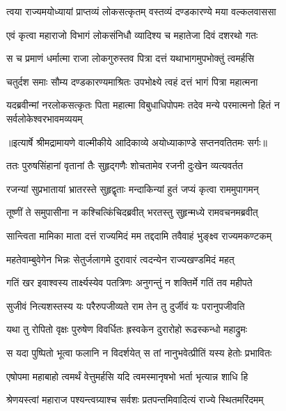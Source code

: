 \twolineshloka
{त्वया राज्यमयोध्यायां प्राप्तव्यं लोकसत्कृतम्}
{वस्तव्यं दण्डकारण्ये मया वल्कलवाससा} %

\twolineshloka
{एवं कृत्वा महाराजो विभागं लोकसंनिधौ}
{व्यादिश्य च महातेजा दिवं दशरथो गतः} %

\twolineshloka
{स च प्रमाणं धर्मात्मा राजा लोकगुरुस्तव}
{पित्रा दत्तं यथाभागमुपभोक्तुं त्वमर्हसि} %

\twolineshloka
{चतुर्दश समाः सौम्य दण्डकारण्यमाश्रितः}
{उपभोक्ष्ये त्वहं दत्तं भागं पित्रा महात्मना} %

\fourlineindentedshloka
{यदब्रवीन्मां नरलोकसत्कृतः}
{ पिता महात्मा विबुधाधिपोपमः}
{तदेव मन्ये परमात्मनो हितं}
{ न सर्वलोकेश्वरभावमव्ययम्} %


{॥इत्यार्षे श्रीमद्रामायणे वाल्मीकीये आदिकाव्ये अयोध्याकाण्डे सप्तनवतितमः सर्गः॥}


\twolineshloka
{ततः पुरुषसिंहानां वृतानां तैः सुहृद्गणैः}
{शोचतामेव रजनी दुःखेन व्यत्यवर्तत} %

\twolineshloka
{रजन्यां सुप्रभातायां भ्रातरस्ते सुहृद्वृताः}
{मन्दाकिन्यां हुतं जप्यं कृत्वा राममुपागमन्} %

\twolineshloka
{तूष्णीं ते समुपासीना न कश्चित्किंचिदब्रवीत्}
{भरतस्तु सुहृन्मध्ये रामवचनमब्रवीत्} %

\twolineshloka
{सान्त्विता मामिका माता दत्तं राज्यमिदं मम}
{तद्ददामि तवैवाहं भुङ्क्ष्व राज्यमकण्टकम्} %

\twolineshloka
{महतेवाम्बुवेगेन भिन्नः सेतुर्जलागमे}
{दुरावारं त्वदन्येन राज्यखण्डमिदं महत्} %

\twolineshloka
{गतिं खर इवाश्वस्य तार्क्ष्यस्येव पतत्रिणः}
{अनुगन्तुं न शक्तिर्मे गतिं तव महीपते} %

\twolineshloka
{सुजीवं नित्यशस्तस्य यः परैरुपजीव्यते}
{राम तेन तु दुर्जीवं यः परानुपजीवति} %

\twolineshloka
{यथा तु रोपितो वृक्षः पुरुषेण विवर्धितः}
{ह्रस्वकेन दुरारोहो रूढस्कन्धो महाद्रुमः} %

\twolineshloka
{स यदा पुष्पितो भूत्वा फलानि न विदर्शयेत्}
{स तां नानुभवेत्प्रीतिं यस्य हेतोः प्रभावितः} %

\twolineshloka
{एषोपमा महाबाहो त्वमर्थं वेत्तुमर्हसि}
{यदि त्वमस्मानृषभो भर्ता भृत्यान्न शाधि हि} %

\twolineshloka
{श्रेणयस्त्वां महाराज पश्यन्त्वग्र्याश्च सर्वशः}
{प्रतपन्तमिवादित्यं राज्ये स्थितमरिंदमम्} %

